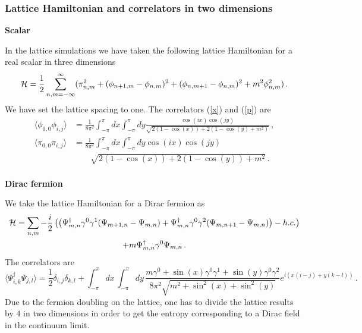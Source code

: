 \documentclass[11pt]{article}
\begin{document}
\subsubsection{Lattice Hamiltonian and correlators in two  dimensions}

\noindent 
\textbf{Scalar}


\noindent In the lattice simulations we have taken the following lattice Hamiltonian for a real scalar in three dimensions   
\begin{equation}
{\cal H}=\frac{1}{2}\sum_{n,m=-\infty}^{\infty}( \pi _{n,m}^{2}+(\phi _{n+1,m}-\phi_{n,m})^{2}+(\phi _{n,m+1}-\phi_{n,m})^{2} +m^2 \phi _{n,m}^{2})\,.
\end{equation}
We have set the lattice spacing to one. 
The correlators (\ref{x}) and (\ref{p}) are  
\begin{align*}
\langle \phi_{0,0}\phi_{i,j}\rangle &=\frac{1}{8\pi^2}\int_{-\pi}^{\pi}dx \int_{-\pi}^{\pi}dy\frac{\cos(i x)\cos(j y)}{\sqrt{2
(1-\cos(x))+2
(1-\cos(y)+m^2)}}\,, \\
\langle \pi_{0,0}\pi_{i,j}\rangle &= \frac{1}{8\pi^2}\int_{-\pi}^{\pi} dx\int_{-\pi}^{\pi}dy \cos(i x)\cos(j y) \\
&\qquad \sqrt{2 (1-\cos(x))+2 (1-\cos(y))+m^2}\,.\\
\end{align*}

\noindent
\textbf{Dirac fermion}

\noindent We take the lattice Hamiltonian for a Dirac fermion as
\begin{multline}
{\cal H}=\sum_{n,m} -\frac{i}{2}\left(\left(\Psi^\dagger_{m,n} \gamma^0\gamma^1(\Psi_{m+1,n}-\Psi_{m,n})+\Psi^\dagger_{m,n} \gamma^0\gamma^2(\Psi_{m,n+1}-\Psi_{m,n})\right)-h.c.\right) \\ 
+m  \Psi_{m,n}^\dagger\gamma^0 \Psi_{m,n}\,. 
\end{multline}
The correlators are
\begin{equation}
\langle \Psi^\dagger_{i,k}\Psi_{j,l}\rangle=\frac{1}{2}\delta_{i,j}\delta_{k,l}+\int_{-\pi}^\pi dx\, \int_{-\pi}^\pi dy\, \frac{m \gamma^0+\sin( x)\gamma^0 \gamma^1+\sin( y)\gamma^0\gamma^2}{8 \pi^2 \sqrt{m^2+\sin^2( x)+\sin^2( y)}} e^{ i (x (i-j)+y (k-l))}\,.
\end{equation}
Due to the fermion doubling on the lattice, one has to divide the lattice results by $4$ in two dimensions in order to get the entropy corresponding to a Dirac field in the continuum limit.  

\smallskip
\end{document}
